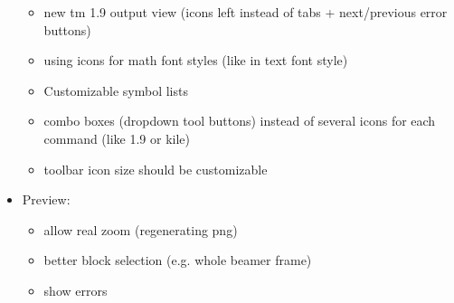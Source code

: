 \documentclass[10pt,a4paper,landscape]{report}
\begin{document}
\begin{itemize}
\begin{itemize}
		\item new tm 1.9 output view (icons left instead of tabs + next/previous error buttons)
		\item using icons for math font styles (like in text font style)
		\item Customizable symbol lists
		\item combo boxes (dropdown tool buttons) instead of several icons for each command (like 1.9 or kile)
		\item toolbar icon size should be customizable
	\end{itemize}
	\item Preview: \begin{itemize}
		\item allow real zoom (regenerating png)
		\item better block selection (e.g. whole beamer frame)
		\item show errors
		

\end{itemize}
\end{itemize}
\end{document}

